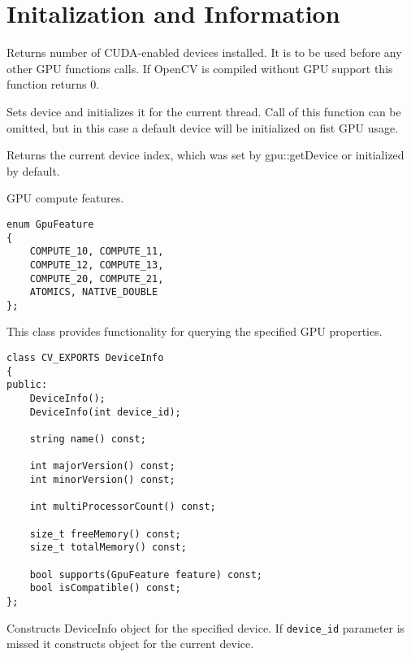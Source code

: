 \section{Initalization and Information}


Returns number of CUDA-enabled devices installed. It is to be used before any other GPU functions calls. If OpenCV is compiled without GPU support this function returns 0. 



Sets device and initializes it for the current thread. Call of this function can be omitted, but in this case a default device will be initialized on fist GPU usage.

\begin{description}
\end{description}


Returns the current device index, which was set by {gpu::getDevice} or initialized by default.



\label{cpp.gpu.GpuFeature}
GPU compute features.

\begin{lstlisting}
enum GpuFeature
{
    COMPUTE_10, COMPUTE_11,
    COMPUTE_12, COMPUTE_13,
    COMPUTE_20, COMPUTE_21,
    ATOMICS, NATIVE_DOUBLE
};
\end{lstlisting}


This class provides functionality for querying the specified GPU properties. 

\begin{lstlisting}
class CV_EXPORTS DeviceInfo
{
public:
    DeviceInfo();
    DeviceInfo(int device_id);

    string name() const;

    int majorVersion() const;
    int minorVersion() const;

    int multiProcessorCount() const;

    size_t freeMemory() const;
    size_t totalMemory() const;

    bool supports(GpuFeature feature) const;
    bool isCompatible() const;
};
\end{lstlisting}


Constructs DeviceInfo object for the specified device. If \texttt{device\_id} parameter is missed it constructs object for the current device.

